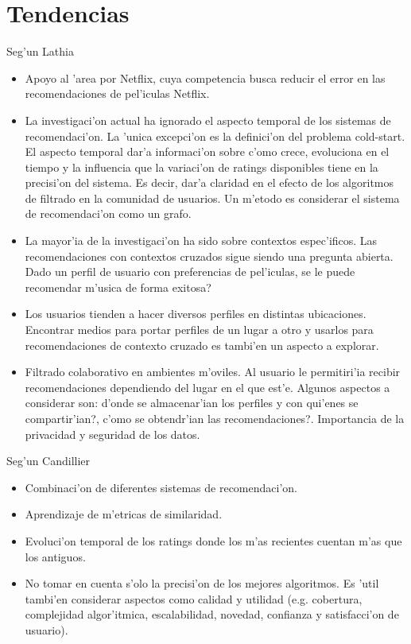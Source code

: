 \documentclass[11pt]{article}
\begin{document}
\section{Tendencias}
Seg'un Lathia~\cite{recsys:nlathia}\\
\begin{itemize}
\item Apoyo al 'area por Netflix, cuya competencia busca reducir el error en las recomendaciones de pel'iculas Netflix.
\item La investigaci'on actual ha ignorado el aspecto temporal de los sistemas de recomendaci'on. La 'unica excepci'on es la definici'on del problema cold-start. El aspecto temporal dar'a informaci'on sobre c'omo crece, evoluciona en el tiempo y la influencia que la variaci'on de ratings disponibles tiene en la precisi'on del sistema. Es decir, dar'a claridad en el efecto de los algoritmos de filtrado en la comunidad de usuarios. Un m'etodo es considerar el sistema de recomendaci'on como un grafo.
\item La mayor'ia de la investigaci'on ha sido sobre contextos espec'ificos. Las recomendaciones con contextos cruzados sigue siendo una pregunta abierta. Dado un perfil de usuario con preferencias de pel'iculas, \textquestiondown se le puede recomendar m'usica de forma exitosa?
\item Los usuarios tienden a hacer diversos perfiles en distintas ubicaciones. Encontrar medios para portar perfiles de un lugar a otro y usarlos para recomendaciones de contexto cruzado es tambi'en un aspecto a explorar.
\item Filtrado colaborativo en ambientes m'oviles. Al usuario le permitiri'ia recibir recomendaciones dependiendo del lugar en el que est'e. Algunos aspectos a considerar son: \textquestiondown d'onde se almacenar'ian los perfiles y con qui'enes se compartir'ian?, \textquestiondown c'omo se obtendr'ian las recomendaciones?. Importancia de la privacidad y seguridad de los datos.
\end{itemize}

Seg'un Candillier~\cite{start:candillier09}\\
\begin{itemize}
\item Combinaci'on de diferentes sistemas de recomendaci'on.
\item Aprendizaje de m'etricas de similaridad.
\item Evoluci'on temporal de los ratings donde los m'as recientes cuentan m'as que los antiguos.
\item No tomar en cuenta s'olo la precisi'on de los mejores algoritmos. Es 'util tambi'en considerar aspectos como calidad y utilidad (e.g. cobertura, complejidad algor'itmica, escalabilidad, novedad, confianza y satisfacci'on de usuario).
\end{itemize}
\end{document}
